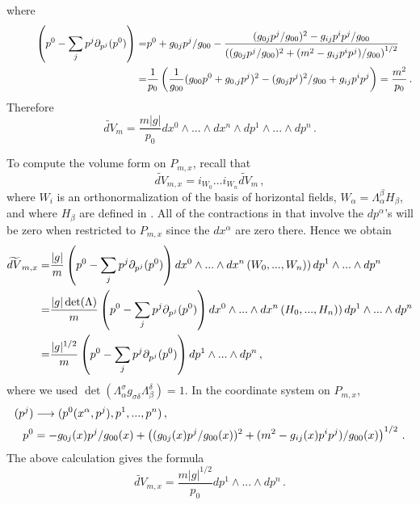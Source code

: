 where
\begin{align}
 \hspace*{1cm}\left(p^0-\sum_jp^j\partial_{p^j}(p^0)\right) =& p^0+g_{0j}p^j/g_{00}-\frac{(g_{0j}p^j/g_{00})^2-g_{ij}p^ip^j/g_{00}}{\left((g_{0j}p^j/g_{00})^2+(m^2-g_{ij}p^ip^j)/g_{00}\right)^{1/2}}\notag\\
=&\frac{1}{p_0}\left(\frac{1}{g_{00}}(g_{00}p^0+g_{0,j}p^j)^2-(g_{0j}p^j)^2/g_{00}+g_{ij}p^ip^j\right)=\frac{m^2}{p_0}\,. 
\end{align}
Therefore
\begin{equation}
\widetilde{dV}_m=\frac{m|g|}{p_0}dx^0\wedge...\wedge dx^n\wedge dp^1\wedge...\wedge dp^n\,.
\end{equation}

To compute the volume form on $P_{m,x}$, recall that 
\begin{equation}\label{contractHoriz}
\widetilde{dV}_{m,x}=i_{W_0}...i_{W_n}\widetilde{dV}_m\,,
\end{equation}
where $W_i$ is an orthonormalization of the basis of horizontal fields, $W_\alpha=\Lambda^\beta_\alpha H_\beta$, and where $H_\beta$ are defined in . All of the contractions in  that involve the $dp^\alpha$'s will be zero when restricted to $P_{m,x}$ since the $dx^\alpha$ are zero there. Hence we obtain
\begin{align}\label{dVx}
\widetilde{dV}_{m,x}=&\frac{|g|}{m}\left(p^0-\sum_{j}p^j \partial_{p^j}(p^0) \right)dx^0\wedge...\wedge dx^n\left(W_0,...,W_n)\right) dp^1\wedge...\wedge dp^n\\
=&\frac{|g|\det(\Lambda)}{m}\left(p^0-\sum_{j}p^j \partial_{p^j}(p^0) \right)dx^0\wedge...\wedge dx^n\left(H_0,...,H_n)\right) dp^1\wedge...\wedge dp^n\notag\\
=&\frac{|g|^{1/2}}{m}\left(p^0-\sum_{j}p^j \partial_{p^j}(p^0) \right) dp^1\wedge...\wedge dp^n\,,\notag
\end{align}
where we used $\det(\Lambda^\sigma_\alpha g_{\sigma\delta}\Lambda^\delta_\beta)=1$.
 In the coordinate system on $P_{m,x}$,
\begin{align}
(p^j)&\longrightarrow (p^0(x^\alpha,p^j),p^1,...,p^n)\,,\\
 p^0&=-g_{0j}(x)p^j/g_{00}(x)+\left((g_{0j}(x)p^j/g_{00}(x))^2+(m^2-g_{ij}(x)p^ip^j)/g_{00}(x)\right)^{1/2}\,.\notag
\end{align}
The above calculation gives the formula
\begin{equation}
\widetilde{dV}_{m,x}=\frac{m|g|^{1/2}}{p_0}dp^1\wedge...\wedge dp^n\,.
\end{equation}



